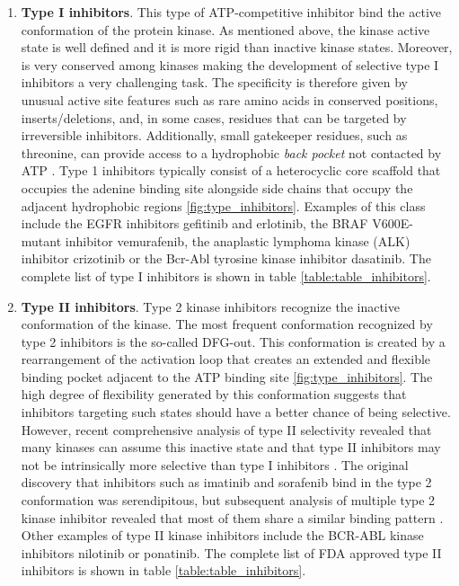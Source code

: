 \documentclass[12pt, b5paper,twoside]{tesi_upf}
\begin{document}
 \begin{enumerate}
 
\item \textbf{Type I inhibitors}. This type of ATP-competitive inhibitor bind the active conformation of the protein kinase. As mentioned above, the kinase active state is well defined and it is more rigid than inactive kinase states. Moreover, is very conserved among kinases making the development of selective type I inhibitors a very challenging task. The specificity is therefore given by unusual active site features such as rare amino acids in conserved positions, inserts/deletions, and, in some cases, residues that can be targeted by irreversible inhibitors. Additionally,  small gatekeeper residues, such as threonine, can provide access to a hydrophobic \textit{back pocket} not contacted by ATP \cite{Noble2004}. Type 1 inhibitors typically consist of a heterocyclic core scaffold that occupies the adenine binding site alongside side chains that occupy the adjacent hydrophobic regions \ref{fig:type_inhibitors}. Examples of this class include the EGFR inhibitors gefitinib and erlotinib, the BRAF V600E-mutant inhibitor vemurafenib, the anaplastic lymphoma kinase (ALK) inhibitor crizotinib or the Bcr-Abl tyrosine kinase inhibitor dasatinib. The complete list of type I inhibitors is shown in table \ref{table:table_inhibitors}. 

\item \textbf{Type II inhibitors}. Type 2 kinase inhibitors recognize the inactive conformation of the kinase. The most frequent conformation recognized by type 2 inhibitors is the so-called DFG-out. This conformation is created by a rearrangement of the activation loop that creates an extended and flexible binding pocket adjacent to the ATP binding site \ref{fig:type_inhibitors}. The high degree of flexibility generated by this conformation suggests that inhibitors targeting such states should have a better chance of being selective. However, recent comprehensive analysis of type II selectivity revealed that many kinases can assume this inactive state and that type II inhibitors may not be intrinsically more selective than type I inhibitors \cite{Inhibitor2016}. The original discovery that inhibitors such as imatinib and sorafenib bind in the type 2 conformation was serendipitous, but subsequent analysis of multiple type 2 kinase inhibitor revealed that most of them share a similar binding pattern \cite{Inhibitor2016}. Other examples of type II kinase inhibitors include the BCR-ABL kinase inhibitors nilotinib or ponatinib. The complete list of FDA approved type II inhibitors is shown in table \ref{table:table_inhibitors}. 


\end{enumerate}
\end{document}
